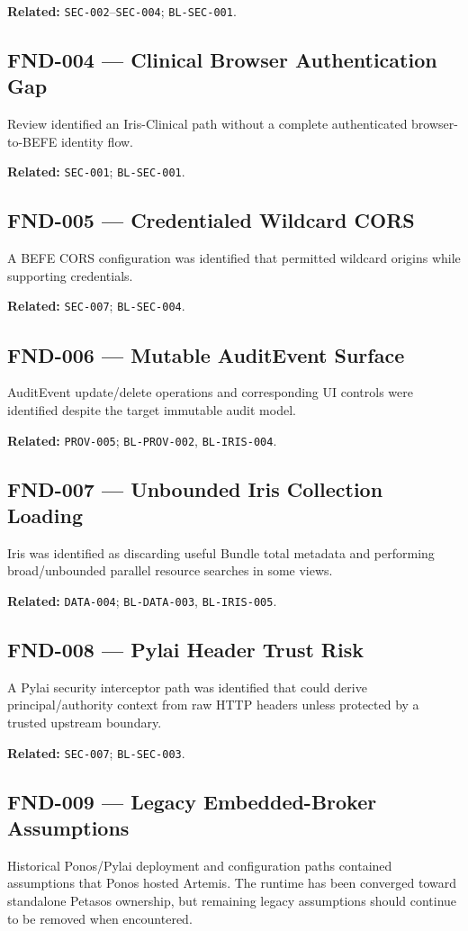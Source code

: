\textbf{Related:} \texttt{SEC-002}--\texttt{SEC-004}; \texttt{BL-SEC-001}.

\subsection{FND-004 --- Clinical Browser Authentication Gap}
Review identified an Iris-Clinical path without a complete authenticated browser-to-BEFE identity flow.

\textbf{Related:} \texttt{SEC-001}; \texttt{BL-SEC-001}.

\subsection{FND-005 --- Credentialed Wildcard CORS}
A BEFE CORS configuration was identified that permitted wildcard origins while supporting credentials.

\textbf{Related:} \texttt{SEC-007}; \texttt{BL-SEC-004}.

\subsection{FND-006 --- Mutable AuditEvent Surface}
AuditEvent update/delete operations and corresponding UI controls were identified despite the target immutable audit model.

\textbf{Related:} \texttt{PROV-005}; \texttt{BL-PROV-002}, \texttt{BL-IRIS-004}.

\subsection{FND-007 --- Unbounded Iris Collection Loading}
Iris was identified as discarding useful Bundle total metadata and performing broad/unbounded parallel resource searches in some views.

\textbf{Related:} \texttt{DATA-004}; \texttt{BL-DATA-003}, \texttt{BL-IRIS-005}.

\subsection{FND-008 --- Pylai Header Trust Risk}
A Pylai security interceptor path was identified that could derive principal/authority context from raw HTTP headers unless protected by a trusted upstream boundary.

\textbf{Related:} \texttt{SEC-007}; \texttt{BL-SEC-003}.

\subsection{FND-009 --- Legacy Embedded-Broker Assumptions}
Historical Ponos/Pylai deployment and configuration paths contained assumptions that Ponos hosted Artemis. The runtime has been converged toward standalone Petasos ownership, but remaining legacy assumptions should continue to be removed when encountered.


